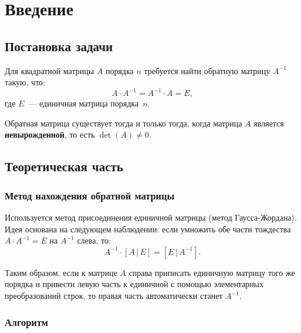 \documentclass[12pt,a4paper]{scrartcl}
\begin{document}
\tableofcontents
\newpage

\section{Введение}
\label{sec:intro}

\subsection{Постановка задачи}

Для квадратной матрицы $A$ порядка $n$ требуется найти обратную матрицу $A^{-1}$
такую, что:
\begin{equation}
    A \cdot A^{-1} = A^{-1} \cdot A = E,
    \label{eq:def}
\end{equation}
где $E$~--- единичная матрица порядка~$n$.

Обратная матрица существует тогда и только тогда, когда матрица $A$ является
\textbf{невырожденной}, то есть $\det(A) \neq 0$.

\subsection{Теоретическая часть}

\subsubsection{Метод нахождения обратной матрицы}

Используется метод присоединения единичной матрицы (метод Гаусса-Жордана).
Идея основана на следующем наблюдении: если умножить обе части тождества
$A \cdot A^{-1} = E$ на $A^{-1}$ слева, то:
\[
    A^{-1} \cdot [A \,|\, E] = [E \,|\, A^{-1}].
\]

Таким образом, если к матрице $A$ справа приписать единичную матрицу того же
порядка и привести левую часть к единичной с помощью элементарных преобразований
строк, то правая часть автоматически станет $A^{-1}$.

\subsubsection{Алгоритм}
\end{document}
